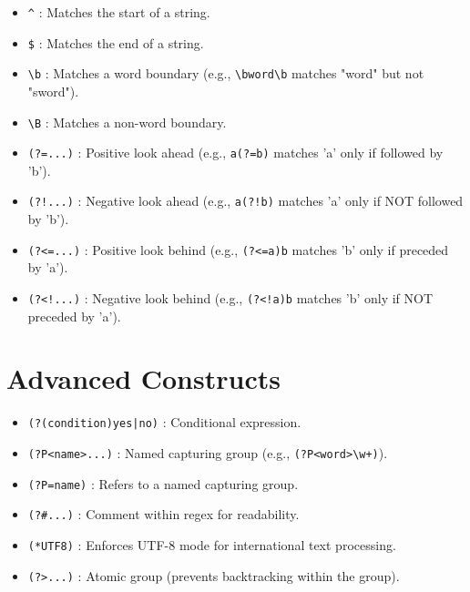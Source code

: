 \begin{itemize}

    \item \texttt{\^} : Matches the start of a string.

    \item \texttt{\$} : Matches the end of a string.

    \item \texttt{\textbackslash b} : Matches a word boundary (e.g., \texttt{\textbackslash bword\textbackslash b} matches "word" but not "sword").

    \item \texttt{\textbackslash B} : Matches a non-word boundary.

    \item \texttt{(?=...)} : Positive look ahead (e.g., \texttt{a(?=b)} matches 'a' only if followed by 'b').

    \item \texttt{(?!...)} : Negative look ahead (e.g., \texttt{a(?!b)} matches 'a' only if NOT followed by 'b').

    \item \texttt{(?<=...)} : Positive look behind (e.g., \texttt{(?<=a)b} matches 'b' only if preceded by 'a').

    \item \texttt{(?<!...)} : Negative look behind (e.g., \texttt{(?<!a)b} matches 'b' only if NOT preceded by 'a').

\end{itemize}

\section{Advanced Constructs}

\begin{itemize}

    \item \texttt{(?(condition)yes|no)} : Conditional expression.

    \item \texttt{(?P<name>...)} : Named capturing group (e.g., \texttt{(?P<word>\textbackslash w+)}).

    \item \texttt{(?P=name)} : Refers to a named capturing group.

    \item \texttt{(?\#...)} : Comment within regex for readability.

    \item \texttt{(*UTF8)} : Enforces UTF-8 mode for international text processing.

    \item \texttt{(?>...)} : Atomic group (prevents backtracking within the group).

\end{itemize}

